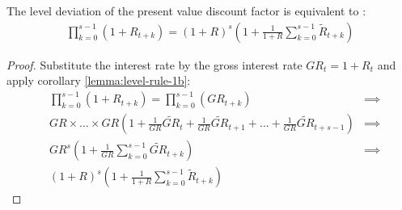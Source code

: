 \documentclass[../thesis.tex]{subfiles}
\begin{document}

\begin{lemma} \label{lemma:product-operator}
	
	The level deviation of the present value discount factor is equivalent to \cite[Lecture 13, p.6]{solis-garcia_ucb_2022}:
	\begin{align*}
		\prod_{k=0}^{s-1}(1+R_{t+k}) = (1 + R)^s \left( 1 + \frac{1}{1 + R} \sum_{k=0}^{s-1} \widetilde{R}_{t+k} \right)
	\end{align*}
	
	\begin{proof}
		Substitute the interest rate by the gross interest rate $GR_t = 1 + R_t$ and apply corollary \ref{lemma:level-rule-1b}:
		\begin{align*}
			& \prod_{k=0}^{s-1}(1+R_{t+k}) = \prod_{k=0}^{s-1}(GR_{t+k})
			&\implies \nonumber \\
			& GR \times \dots \times GR \left( 1 + \frac{1}{GR} \widetilde{GR}_t + \frac{1}{GR} \widetilde{GR}_{t+1} + \dots + \frac{1}{GR} \widetilde{GR}_{t+s-1} \right)
			&\implies \nonumber \\
			& GR^s \left( 1 + \frac{1}{GR} \sum_{k=0}^{s-1} \widetilde{GR}_{t+k} \right)
			&\implies \nonumber \\
			& (1 + R)^s \left( 1 + \frac{1}{1 + R} \sum_{k=0}^{s-1} \widetilde{R}_{t+k} \right) &\,
		\end{align*}
	\end{proof}
	
\end{lemma}

\begin{comment}



\end{comment}
\end{document}
